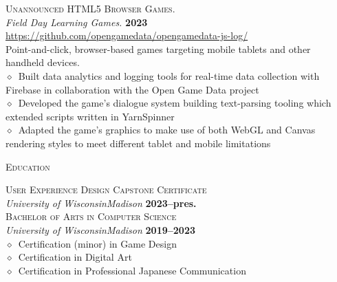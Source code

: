 \documentclass[11pt, a4paper]{article}
\newcommand{\dates}[1]{\hfill\mbox{\textbf{#1}}} %
\newcommand{\smaller}[1]{{\small$\diamond$\ #1}}
\newcommand{\headright}[1]{\vspace*{2.5ex}\textsc{\Large\color{cvblue}#1}\par%
     \vspace*{-2ex}{\color{cvblue}\hrulefill}\par}
\begin{document}
\begin{minipage}[t]{0.56\textwidth}
\textsc{Unannounced HTML5 Browser Games.} \\ \textit{Field Day Learning Games.} \dates{2023} \\
\url{https://github.com/opengamedata/opengamedata-js-log/} \\
\small{Point-and-click, browser-based games targeting mobile tablets and other handheld devices.}\\
\smaller{Built data analytics and logging tools for real-time data collection with Firebase in collaboration with the Open Game Data project}\\
\smaller{Developed the game’s dialogue system building text-parsing tooling which extended scripts written in YarnSpinner}\\
\smaller{Adapted the game's graphics to make use of both WebGL and Canvas rendering styles to meet different tablet and mobile limitations}

\headright{Education}
\textsc{User Experience Design Capstone Certificate} \\
\textit{University of Wisconsin\textemdash Madison} \dates{2023--pres.}\\

\textsc{Bachelor of Arts in Computer Science} \\
\textit{University of Wisconsin\textemdash Madison} \dates{2019--2023}\\
\smaller{Certification (minor) in Game Design} \\
\smaller{Certification in Digital Art} \\
\smaller{Certification in Professional Japanese Communication}

\end{minipage}
\end{document}
